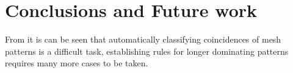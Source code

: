 \chapter{Conclusions and Future work}
From  it is can be seen that automatically classifying
coincidences of mesh patterns is a difficult task, establishing rules for longer
dominating patterns requires many more cases to be taken.
